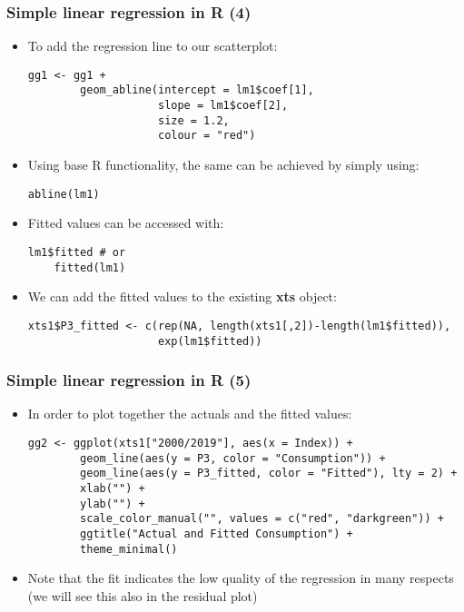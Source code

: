 \documentclass[10pt]{beamer}
\theoremstyle{definition}
\begin{document}
\begin{frame}[fragile]
\frametitle{Simple linear regression in R (4)}
\begin{itemize}
	\item To add the regression line to our scatterplot:
	\begin{lstlisting}[style = rstyle, breaklines]
	gg1 <- gg1 + 
  		geom_abline(intercept = lm1$coef[1], 
              		slope = lm1$coef[2],
              		size = 1.2,
              		colour = "red")
	\end{lstlisting}
	\item Using base R functionality, the same can be achieved by simply using:
	\begin{lstlisting}[style = rstyle, breaklines]
	abline(lm1)
	\end{lstlisting}
	\item Fitted values can be accessed with:
	\begin{lstlisting}[style = rstyle, breaklines]
	lm1$fitted # or
	fitted(lm1)
	\end{lstlisting}
	\item We can add the fitted values to the existing \textbf{xts} object:
	\begin{lstlisting}[style = rstyle, breaklines]
	xts1$P3_fitted <- c(rep(NA, length(xts1[,2])-length(lm1$fitted)),
                    exp(lm1$fitted))
	\end{lstlisting}
\end{itemize}
\end{frame}

\begin{frame}[fragile]
\frametitle{Simple linear regression in R (5)}
\begin{itemize}
	\item In order to plot together the actuals and the fitted values:
	\begin{lstlisting}[style = rstyle, breaklines]
	gg2 <- ggplot(xts1["2000/2019"], aes(x = Index)) + 
		geom_line(aes(y = P3, color = "Consumption")) + 
		geom_line(aes(y = P3_fitted, color = "Fitted"), lty = 2) + 
		xlab("") + 
		ylab("") + 
		scale_color_manual("", values = c("red", "darkgreen")) +
		ggtitle("Actual and Fitted Consumption") + 
		theme_minimal()
	\end{lstlisting}
	\item Note that the fit indicates the low quality of the regression in many respects (we will see this also in the residual plot)
\end{itemize}
\end{frame}
\end{document}
